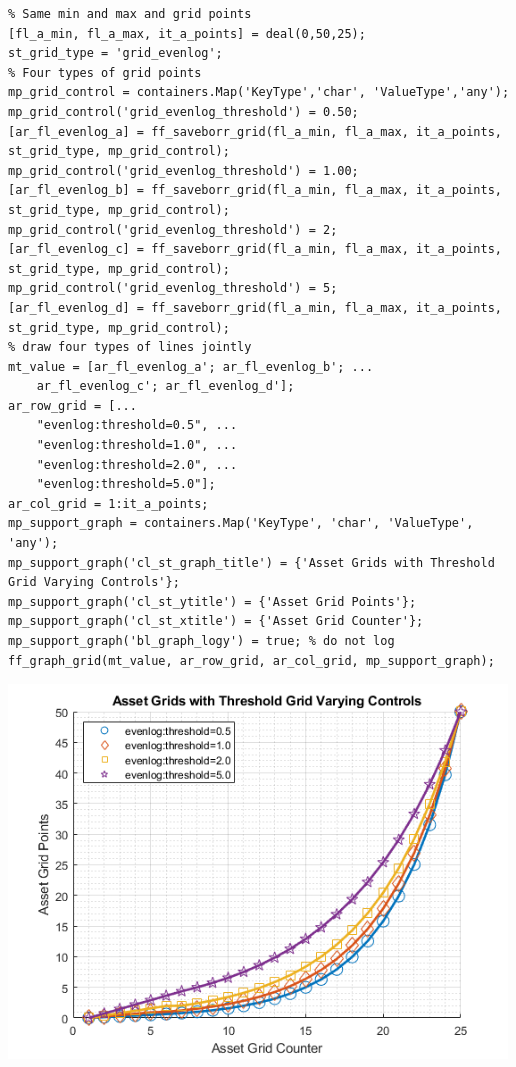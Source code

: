 \documentclass[
]{book}
\begin{document}
\begin{verbatim}
% Same min and max and grid points
[fl_a_min, fl_a_max, it_a_points] = deal(0,50,25);
st_grid_type = 'grid_evenlog';
% Four types of grid points
mp_grid_control = containers.Map('KeyType','char', 'ValueType','any');
mp_grid_control('grid_evenlog_threshold') = 0.50;
[ar_fl_evenlog_a] = ff_saveborr_grid(fl_a_min, fl_a_max, it_a_points, st_grid_type, mp_grid_control);
mp_grid_control('grid_evenlog_threshold') = 1.00;
[ar_fl_evenlog_b] = ff_saveborr_grid(fl_a_min, fl_a_max, it_a_points, st_grid_type, mp_grid_control);
mp_grid_control('grid_evenlog_threshold') = 2;
[ar_fl_evenlog_c] = ff_saveborr_grid(fl_a_min, fl_a_max, it_a_points, st_grid_type, mp_grid_control);
mp_grid_control('grid_evenlog_threshold') = 5;
[ar_fl_evenlog_d] = ff_saveborr_grid(fl_a_min, fl_a_max, it_a_points, st_grid_type, mp_grid_control);
% draw four types of lines jointly
mt_value = [ar_fl_evenlog_a'; ar_fl_evenlog_b'; ...
    ar_fl_evenlog_c'; ar_fl_evenlog_d'];
ar_row_grid = [...
    "evenlog:threshold=0.5", ...
    "evenlog:threshold=1.0", ...
    "evenlog:threshold=2.0", ...
    "evenlog:threshold=5.0"];
ar_col_grid = 1:it_a_points;
mp_support_graph = containers.Map('KeyType', 'char', 'ValueType', 'any');
mp_support_graph('cl_st_graph_title') = {'Asset Grids with Threshold Grid Varying Controls'};
mp_support_graph('cl_st_ytitle') = {'Asset Grid Points'};
mp_support_graph('cl_st_xtitle') = {'Asset Grid Counter'};
mp_support_graph('bl_graph_logy') = true; % do not log
ff_graph_grid(mt_value, ar_row_grid, ar_col_grid, mp_support_graph);
\end{verbatim}

\includegraphics[width=5.20833in,height=\textheight]{img/fx_saveborr_grid_images/figure_6.png}
\end{document}
